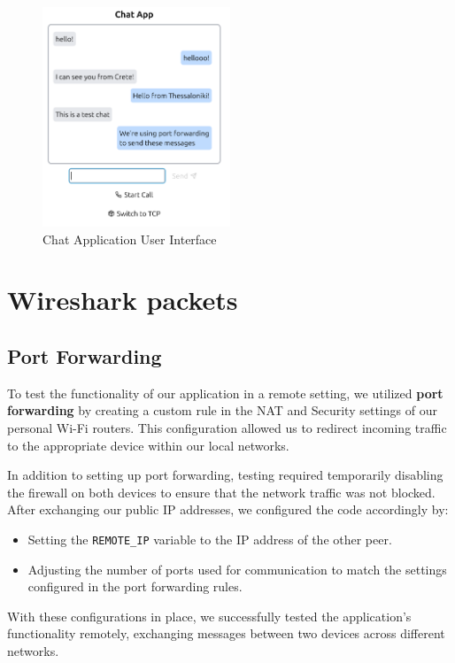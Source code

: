 \documentclass{article}
\begin{document}
\begin{figure}[h!]
    \centering
    \includegraphics[width=0.5\textwidth]{chat1.png}
    \caption{Chat Application User Interface}
    \label{fig:chat1}
\end{figure}

\section{Wireshark packets}

\subsection{Port Forwarding}

To test the functionality of our application in a remote setting, we utilized \textbf{port forwarding} by creating a custom rule in the NAT and Security settings of our personal Wi-Fi routers. This configuration allowed us to redirect incoming traffic to the appropriate device within our local networks.

In addition to setting up port forwarding, testing required temporarily disabling the firewall on both devices to ensure that the network traffic was not blocked. After exchanging our public IP addresses, we configured the code accordingly by:
\begin{itemize}
    \item Setting the \texttt{REMOTE\_IP} variable to the IP address of the other peer.
    \item Adjusting the number of ports used for communication to match the settings configured in the port forwarding rules.
\end{itemize}

With these configurations in place, we successfully tested the application's functionality remotely, exchanging messages between two devices across different networks.
\end{document}
